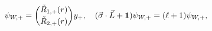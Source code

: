 \begin{equation}
\label{pW+} \psi_{W,+} ={\tilde R_{1,+}(r)\choose\tilde R_{2,+}(r)} y_+,
\quad (\vec \sigma \cdot \vec L + {\bf 1})\psi_{W,+} = (\ell +
1)\psi_{W,+},
\end{equation}

